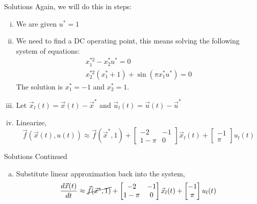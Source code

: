\documentclass{beamer}
\begin{document}
	\begin{frame}{Solutions}
	Again, we will do this in steps: 
	\begin{enumerate}[(i)]
	    \item We are given $u^* = 1$ \pause
	    \item We need to find a DC operating point, this means solving the following system of equations:
	    \begin{align}
	        x_1^{*2}- x_2^*u^* = 0 \\
	        x_2^{*2}(x_1^* + 1) + \sin(\pi x_1^*u^*) = 0
	    \end{align} 
	    The solution is $x_1^* = -1$ and $x_2^* = 1$. \pause \\
	    \item Let $\vec{x}_l(t) = \vec{x}(t) - \vec{x}^*$ and $\vec{u}_l(t) = \vec{u}(t) - \vec{u}^*$ \pause \\
	    \item Linearize, 
	    \[ \vec{f}(\vec{x}(t), u(t)) \approx 
	   \vec{f}(\vec{x}^*, 1) + \begin{bmatrix}
	    -2 & -1 \\
	    1 - \pi & 0 
	    \end{bmatrix} 
	   \vec{x}_l(t) + \begin{bmatrix}
	   -1 \\ \pi
	   \end{bmatrix}
	   u_l(t)
	    \]

	        
	  
	\end{enumerate}
	\end{frame}

	\begin{frame}{Solutions Continued}
	    \begin{enumerate}[(v)]
	        \item Substitute linear approximation back into the system,
	            \[ \frac{d\vec{x}(t)}{dt} \approx 
	            \cancel{\vec{f}(\vec{x}^*, 1)} + \begin{bmatrix}
	            -2 & -1 \\
	            1 - \pi & 0 
	            \end{bmatrix} 
	            \vec{x}_l(t) + \begin{bmatrix}
	            -1 \\ \pi
	            \end{bmatrix}
	            u_l(t)
	            \]
	    \end{enumerate}
	\end{frame}
\end{document}
